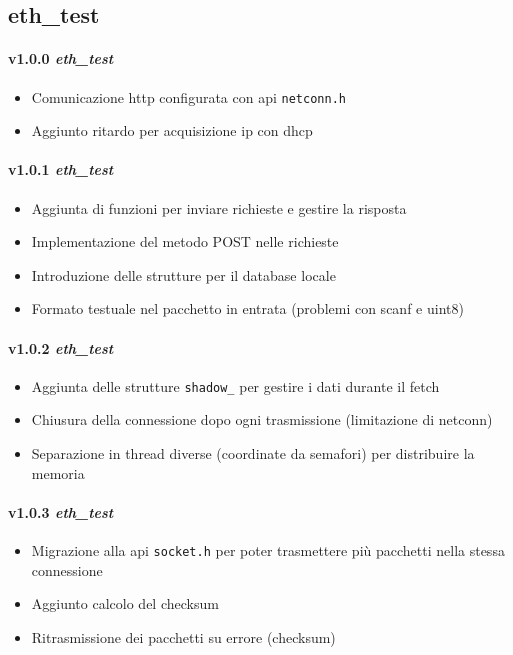 \subsection*{eth\_test}

\paragraph{v1.0.0 \textit{eth\_test}}
	\begin{itemize}
		\item Comunicazione http configurata con api \texttt{netconn.h}
		\item Aggiunto ritardo per acquisizione ip con dhcp
	\end{itemize}
\paragraph{v1.0.1 \textit{eth\_test}}
	\begin{itemize}
		\item Aggiunta di funzioni per inviare richieste e gestire la risposta
		\item Implementazione del metodo POST nelle richieste
		\item Introduzione delle strutture per il database locale
		\item Formato testuale nel pacchetto in entrata (problemi con scanf e uint8)
	\end{itemize}
\paragraph{v1.0.2 \textit{eth\_test}}
	\begin{itemize}
		\item Aggiunta delle strutture \texttt{shadow\_} per gestire i dati durante il fetch
		\item Chiusura della connessione dopo ogni trasmissione (limitazione di netconn)
		\item Separazione in thread diverse (coordinate da semafori) per distribuire la memoria
	\end{itemize}
\paragraph{v1.0.3 \textit{eth\_test}}
	\begin{itemize}
		\item Migrazione alla api \texttt{socket.h} per poter trasmettere pi\`{u} pacchetti nella stessa connessione
		\item Aggiunto calcolo del checksum 
		\item Ritrasmissione dei pacchetti su errore (checksum)
	\end{itemize}
